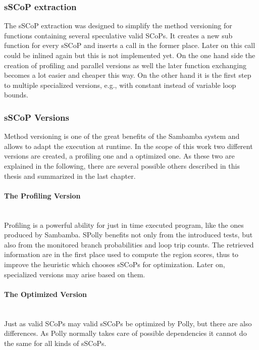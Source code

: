 \orange
\begin{shaded}

\subsubsection{sSCoP extraction}
The sSCoP extraction was designed to simplify the method versioning for functions 
containing several speculative valid SCoPs. It creates a new sub function for 
every sSCoP and inserts a call in the former place. Later on this call could be
inlined again but this is not implemented yet. On the one hand side the creation 
of profiling and parallel versions as well the later function exchanging becomes
a lot easier and cheaper this way. On the other hand it is the first step to 
multiple specialized versions, e.g., with constant instead of variable loop 
bounds.


\end{shaded}

\orange
\begin{shaded}

\subsubsection{sSCoP Versions}
Method versioning is one of the great benefits of the Sambamba system and allows
to adapt the execution at runtime. In the scope of this work two different 
versions are created, a profiling one and a optimized one. As these two are 
explained in the following, there are several possible others described in this
thesis and summarized in the last chapter. 



\paragraph{The Profiling Version\\}
~\\
Profiling is a powerful ability for just in time executed program, like the ones
produced by Sambamba. SPolly benefits not only from the introduced tests, but also
from the monitored branch probabilities and loop trip counts. The retrieved 
information are in the first place used to compute the region scores, thus to
improve the heuristic which chooses sSCoPs for optimization. Later on,
specialized versions may arise based on them. 

\end{shaded}

\red
\begin{shaded}

\paragraph{The Optimized Version \\}
~\\
Just as valid SCoPs may valid sSCoPs be optimized by Polly, but there are also 
differences. As Polly normally takes care of possible dependencies it cannot 
do the same for all kinds of sSCoPs. 

\end{shaded}


